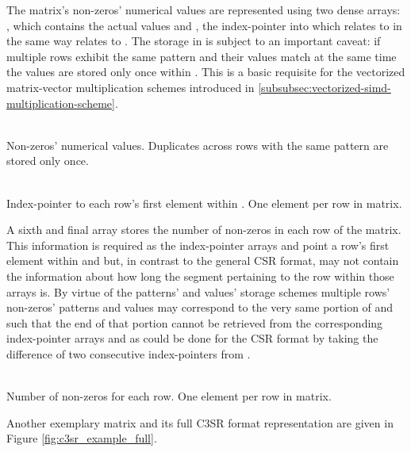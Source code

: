 \documentclass{article}
\begin{document}
    The matrix's non-zeros' numerical values are represented using two dense arrays: \V, which contains the actual values and \VS, the index-pointer into \V which relates to \V in the same way \JS relates to \J. The storage in \V is subject to an important caveat: if multiple rows exhibit the same pattern and their values match at the same time the values are stored only once within \V. This is a basic requisite for the vectorized matrix-vector multiplication schemes introduced in \ref{subsubsec:vectorized-simd-multiplication-scheme}.

    \begin{description}[align = left, labelwidth = 4cm]
      \item [\V - \emph{Values}] \hfill \\
        Non-zeros' numerical values. Duplicates across rows with the same pattern are stored only once.
      \item [\VS - \emph{Values' index-pointers}] \hfill \\
        Index-pointer to each row's first element within \V. One element per row in matrix.
    \end{description}

    A sixth and final array \RS stores the number of non-zeros in each row of the matrix. This information is required as the index-pointer arrays \JS and \VS point a row's first element within \J and \V but, in contrast to the general CSR format, may not contain the information about how long the segment pertaining to the row within those arrays is. By virtue of the patterns' and values' storage schemes multiple rows' non-zeros' patterns and values may correspond to the very same portion of \J and \V such that the end of that portion cannot be retrieved from the corresponding index-pointer arrays \JS and \VS as could be done for the CSR format by taking the difference of two consecutive index-pointers from \RP.

    \begin{description}[align = left, labelwidth = 4cm]
      \item [\RS - \emph{Row sizes}] \hfill \\
        Number of non-zeros for each row. One element per row in matrix.
    \end{description}

    Another exemplary matrix and its full C3SR format representation are given in Figure \ref{fig:c3sr_example_full}.
\end{document}
